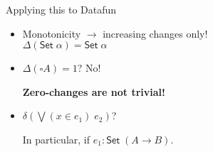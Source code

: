 \documentclass[dvipsnames]{beamer}
\newcommand{\ms}{\mathsf}
\begin{document}
\begin{frame}{Applying this to Datafun}
  \large
  \begin{itemize}
  \item Monotonicity $\to$ increasing changes only!\\
    $\Delta(\ms{Set}\; \alpha) = \ms{Set}\;\alpha$

    \vspace{0.2cm}

  \item $\Delta(\square A) = 1$? No!

    \textbf{Zero-changes are not trivial!}

    \vspace{0.2cm}

  \item $\delta (\bigvee(x \in e_1)\; e_2)$?

    In particular, if $e_1 : \ms{Set}\; (A \to B)$.

    \vspace{0.2cm}

  \end{itemize}
\end{frame}
\end{document}
